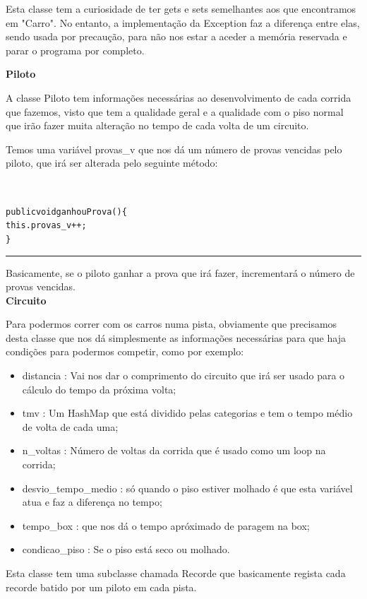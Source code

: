 \documentclass[10pt]{article}
\newenvironment{code}                    
{\textbf{
} \hspace{1cm} \hrulefill \\ 
\smallskip 
\begin{center}
\begin{minipage}{0.9\textwidth} 
\begin{alltt}\small}
{\end{alltt}
\end{minipage}
\end{center}
\hrule\smallskip
}
\begin{document}
Esta classe tem a curiosidade de ter gets e sets semelhantes aos que encontramos em "Carro". No entanto, a implementação da Exception faz a diferença entre elas, sendo usada por precaução, para não nos estar a aceder a memória reservada e parar o programa por completo.

\pagebreak
\textbf{Piloto}

A classe Piloto tem informações necessárias ao desenvolvimento de cada corrida que fazemos, visto que tem a qualidade geral e a qualidade com o piso normal que irão fazer muita alteração no tempo de cada volta de um circuito.

Temos uma variável provas\_v que nos dá um número de provas vencidas pelo piloto, que irá ser alterada pelo seguinte método:

\begin{code}
public void ganhouProva ()\{
        this.provas_v++;
\}
\end{code}

Basicamente, se o piloto ganhar a prova que irá fazer, incrementará o número de provas vencidas.
\\

\textbf{Circuito}

Para podermos correr com os carros numa pista, obviamente que precisamos desta classe que nos dá simplesmente as informações necessárias para que haja condições para podermos competir, como por exemplo:

\begin{itemize}
\item distancia : Vai nos dar o comprimento do circuito que irá ser usado para o cálculo do tempo da próxima volta;
\item tmv : Um HashMap que está dividido pelas categorias e tem o tempo médio de volta de cada uma;
\item n\_voltas : Número de voltas da corrida que é usado como um loop na corrida;
\item desvio\_tempo\_medio : só quando o piso estiver molhado é que esta variável atua e faz a diferença no tempo;
\item tempo\_box : que nos dá o tempo apróximado de paragem na box;
\item condicao\_piso : Se o piso está seco ou molhado.
\end{itemize}

Esta classe tem uma subclasse chamada Recorde que basicamente regista cada recorde batido por um piloto em cada pista.
\\
\\
\\
\end{document}
